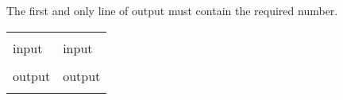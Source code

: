 \strut


The first and only line of output must contain the required number.

\strut


\begin{center}
\fontfamily{\ttdefault}
\fontsize{10pt}{1em}
\selectfont
\begin{tabu}to 0.99\textwidth{|X[1]|X[1]|}
\hline
& \\ 
\rowfont{\fontsize{10pt}{1em}\bfseries}
input & input \\
 & 
 \\
\rowfont{\fontsize{10pt}{1em}\bfseries}
output & output \\
 & 
 \\
\hline
\end{tabu}
\end{center}

{
\fontsize{10pt}{1em}
\selectfont
}